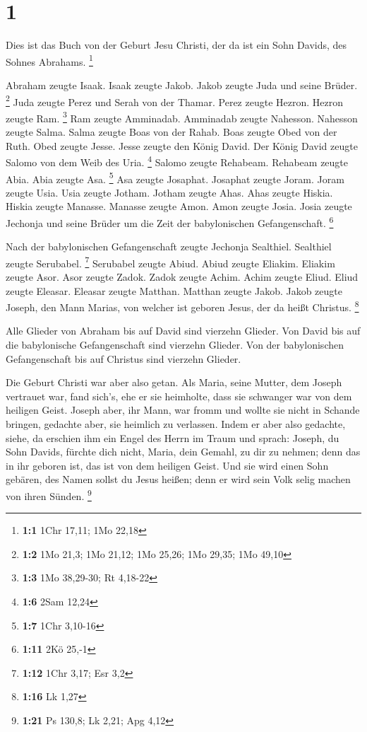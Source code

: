 \hypertarget{section}{%
\section{1}\label{section}}

 Dies ist das Buch von der Geburt Jesu Christi, der da ist
ein Sohn Davids, des Sohnes Abrahams. \footnote{\textbf{1:1} 1Chr 17,11;
  1Mo 22,18}

 Abraham zeugte Isaak. Isaak zeugte Jakob. Jakob zeugte Juda
und seine Brüder. \footnote{\textbf{1:2} 1Mo 21,3; 1Mo 21,12; 1Mo 25,26;
  1Mo 29,35; 1Mo 49,10}  Juda zeugte Perez und Serah von der
Thamar. Perez zeugte Hezron. Hezron zeugte Ram. \footnote{\textbf{1:3}
  1Mo 38,29-30; Rt 4,18-22}  Ram zeugte Amminadab. Amminadab
zeugte Nahesson. Nahesson zeugte Salma.  Salma zeugte Boas
von der Rahab. Boas zeugte Obed von der Ruth. Obed zeugte Jesse.
 Jesse zeugte den König David. Der König David zeugte Salomo
von dem Weib des Uria. \footnote{\textbf{1:6} 2Sam 12,24} 
Salomo zeugte Rehabeam. Rehabeam zeugte Abia. Abia zeugte Asa.
\footnote{\textbf{1:7} 1Chr 3,10-16}  Asa zeugte Josaphat.
Josaphat zeugte Joram. Joram zeugte Usia.  Usia zeugte
Jotham. Jotham zeugte Ahas. Ahas zeugte Hiskia.  Hiskia
zeugte Manasse. Manasse zeugte Amon. Amon zeugte Josia. 
Josia zeugte Jechonja und seine Brüder um die Zeit der babylonischen
Gefangenschaft. \footnote{\textbf{1:11} 2Kö 25,-1}

 Nach der babylonischen Gefangenschaft zeugte Jechonja
Sealthiel. Sealthiel zeugte Serubabel. \footnote{\textbf{1:12} 1Chr
  3,17; Esr 3,2}  Serubabel zeugte Abiud. Abiud zeugte
Eliakim. Eliakim zeugte Asor.  Asor zeugte Zadok. Zadok
zeugte Achim. Achim zeugte Eliud.  Eliud zeugte Eleasar.
Eleasar zeugte Matthan. Matthan zeugte Jakob.  Jakob zeugte
Joseph, den Mann Marias, von welcher ist geboren Jesus, der da heißt
Christus. \footnote{\textbf{1:16} Lk 1,27}

 Alle Glieder von Abraham bis auf David sind vierzehn
Glieder. Von David bis auf die babylonische Gefangenschaft sind vierzehn
Glieder. Von der babylonischen Gefangenschaft bis auf Christus sind
vierzehn Glieder.

 Die Geburt Christi war aber also getan. Als Maria, seine
Mutter, dem Joseph vertrauet war, fand sich's, ehe er sie heimholte,
dass sie schwanger war von dem heiligen Geist.  Joseph
aber, ihr Mann, war fromm und wollte sie nicht in Schande bringen,
gedachte aber, sie heimlich zu verlassen.  Indem er aber
also gedachte, siehe, da erschien ihm ein Engel des Herrn im Traum und
sprach: Joseph, du Sohn Davids, fürchte dich nicht, Maria, dein Gemahl,
zu dir zu nehmen; denn das in ihr geboren ist, das ist von dem heiligen
Geist.  Und sie wird einen Sohn gebären, des Namen sollst
du Jesus heißen; denn er wird sein Volk selig machen von ihren Sünden.
\footnote{\textbf{1:21} Ps 130,8; Lk 2,21; Apg 4,12}

